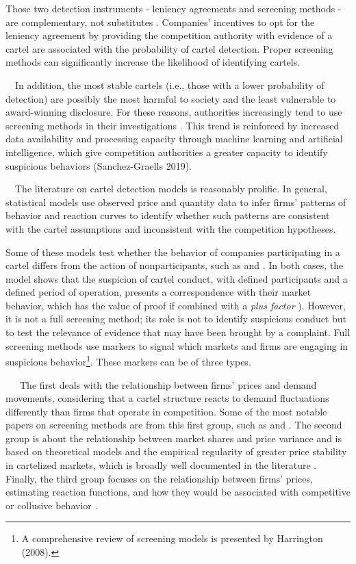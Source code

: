 Those two detection instruments - leniency agreements and screening methods - are complementary, not substitutes  \cite{hüschelrath2014cartel}  \cite{schinkel2013balancing}. Companies' incentives to opt for the leniency agreement by providing the competition authority with evidence of a cartel are associated with the probability of cartel detection. Proper screening methods can significantly increase the likelihood of identifying cartels.

\ \ In addition, the most stable cartels (i.e., those with a lower probability of detection) are possibly the most harmful to society and the least vulnerable to award-winning disclosure. For these reasons, authorities increasingly tend to use screening methods in their investigations  \cite{schinkel2013balancing}  \cite{imhof2018screening}. This trend is reinforced by increased data availability and processing capacity through machine learning and artificial intelligence, which give competition authorities a greater capacity to identify suspicious behaviors (Sanchez-Graells 2019).

\ \ The literature on cartel detection models is reasonably prolific. In general, statistical models use observed price and quantity data to infer firms' patterns of behavior and reaction curves to identify whether such patterns are consistent with the cartel assumptions and inconsistent with the competition hypotheses.

Some of these models test whether the behavior of companies participating in a cartel differs from the action of nonparticipants, such as  \cite{porter1993detection} and  \cite{porter1999ohio}. In both cases, the model shows that the suspicion of cartel conduct, with defined participants and a defined period of operation, presents a correspondence with their market behavior, which has the value of proof if combined with a \textit{plus factor}  \cite{hovenkamp2005federal}). However, it is not a full screening method; its role is not to identify suspicious conduct but to test the relevance of evidence that may have been brought by a complaint. Full screening methods use markers to signal which markets and firms are engaging in suspicious behavior\footnote{ A comprehensive review of screening models is presented by Harrington (2008).}. These markers can be of three types.

\ \ \ The first deals with the relationship between firms' prices and demand movements, considering that a cartel structure reacts to demand fluctuations differently than firms that operate in competition. Some of the most notable papers on screening methods are from this first group, such as  \cite{green1984noncooperative} and  \cite{haltiwanger1991the}. The second group is about the relationship between market shares and price variance and is based on theoretical models and the empirical regularity of greater price stability in cartelized markets, which is broadly well documented in the literature  \cite{abrantesmetz2006a}  \cite{imhof2019detecting}. Finally, the third group focuses on the relationship between firms' prices, estimating reaction functions, and how they would be associated with competitive or collusive behavior  \cite{bajari2003deciding}.


